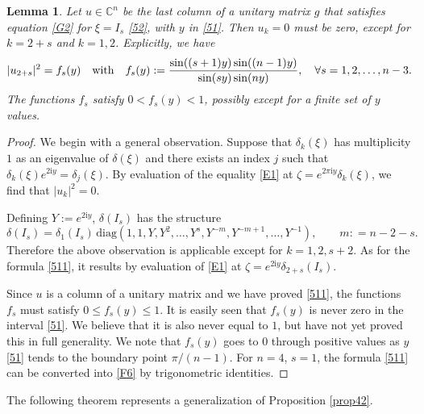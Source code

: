 \documentclass[a4paper,11pt,reqno]{amsart}
\newtheorem{lem}[thm]{Lemma}
\theoremstyle{definition}
\numberwithin{equation}{section}
\newcommand{\be}{\begin{equation}}
\newcommand{\ee}{\end{equation}}
\def\ri{{\mathrm{i}}}                       %
\def\bC{{\mathbb C}}                        %
\def\diag{\mathrm{diag}}                    %
\begin{document}
\begin{lem}\label{lemfs}
Let $u\in \bC^n$ be the last column of a unitary matrix $g$ that satisfies equation \eqref{G2} for $\xi=I_s$ \eqref{52},
with $y$ in \eqref{51}.
Then  $u_k=0$ must be zero, except for $k= 2+s$ and $k=1,2$. Explicitly, we have
\be
\vert u_{2+s}\vert^2 = f_s(y)
\quad \hbox{with}\quad
f_s(y): = \frac{\sin((s+1) y)\sin((n-1)y)}{\sin(s y)\sin(n y)},
\quad \forall  s=1,2,\dots,  n-3.
\label{511}\ee
The functions $f_s$ satisfy $0< f_s(y) < 1$, possibly except for a finite set of $y$ values.
\end{lem}
\begin{proof}
We begin with a general observation. Suppose  that $\delta_k(\xi)$ has multiplicity $1$ as an eigenvalue of
$\delta(\xi)$ and there exists an index $j$ such that $\delta_k(\xi) e^{2\ri y} = \delta_j(\xi)$.
By evaluation of the equality \eqref{E1} at $\zeta = e^{2\pi\ri  y} \delta_k(\xi)$, we  find that
$\vert u_k \vert^2=0$.

Defining  $Y:= e^{2\ri y}$,  $\delta(I_s)$ has the structure
\be
\delta(I_s) = \delta_1(I_s)\, \diag (1,1, Y,Y^2,\dots, Y^s, Y^{-m}, Y^{-m+1},\dots, Y^{-1}),
\qquad m: = n-2 - s.
\label{dIs}\ee
Therefore the above observation is applicable  except for $k=1,2, s+2$.
As for the formula \eqref{511}, it results by evaluation  of \eqref{E1} at $\zeta= e^{2\ri y} \delta_{2+s}(I_s)$.

Since  $u$ is a column of a unitary matrix and we have proved \eqref{511}, the functions $f_s$ must satisfy
$0\leq f_s(y) \leq 1$. It is easily seen that $f_s(y)$ is never zero in the interval \eqref{51}.
We believe that it is also never equal to $1$, but have not yet proved this in  full generality.
We note that $f_s(y)$ goes to $0$ through positive values as $y$ \eqref{51} tends to the boundary point $\pi/(n-1)$.
For $n=4$, $s=1$, the formula \eqref{511} can be converted into \eqref{F6} by trigonometric identities.
\end{proof}


The following theorem represents a generalization of Proposition \ref{prop42}.
\end{document}
